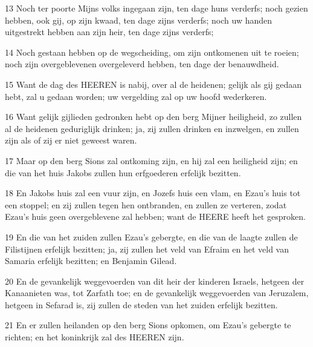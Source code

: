 \par 13 Noch ter poorte Mijns volks ingegaan zijn, ten dage huns verderfs; noch gezien hebben, ook gij, op zijn kwaad, ten dage zijns verderfs; noch uw handen uitgestrekt hebben aan zijn heir, ten dage zijns verderfs;
\par 14 Noch gestaan hebben op de wegscheiding, om zijn ontkomenen uit te roeien; noch zijn overgeblevenen overgeleverd hebben, ten dage der benauwdheid.
\par 15 Want de dag des HEEREN is nabij, over al de heidenen; gelijk als gij gedaan hebt, zal u gedaan worden; uw vergelding zal op uw hoofd wederkeren.
\par 16 Want gelijk gijlieden gedronken hebt op den berg Mijner heiligheid, zo zullen al de heidenen geduriglijk drinken; ja, zij zullen drinken en inzwelgen, en zullen zijn als of zij er niet geweest waren.
\par 17 Maar op den berg Sions zal ontkoming zijn, en hij zal een heiligheid zijn; en die van het huis Jakobs zullen hun erfgoederen erfelijk bezitten.
\par 18 En Jakobs huis zal een vuur zijn, en Jozefs huis een vlam, en Ezau's huis tot een stoppel; en zij zullen tegen hen ontbranden, en zullen ze verteren, zodat Ezau's huis geen overgeblevene zal hebben; want de HEERE heeft het gesproken.
\par 19 En die van het zuiden zullen Ezau's gebergte, en die van de laagte zullen de Filistijnen erfelijk bezitten; ja, zij zullen het veld van Efraim en het veld van Samaria erfelijk bezitten; en Benjamin Gilead.
\par 20 En de gevankelijk weggevoerden van dit heir der kinderen Israels, hetgeen der Kanaanieten was, tot Zarfath toe; en de gevankelijk weggevoerden van Jeruzalem, hetgeen in Sefarad is, zij zullen de steden van het zuiden erfelijk bezitten.
\par 21 En er zullen heilanden op den berg Sions opkomen, om Ezau's gebergte te richten; en het koninkrijk zal des HEEREN zijn.



